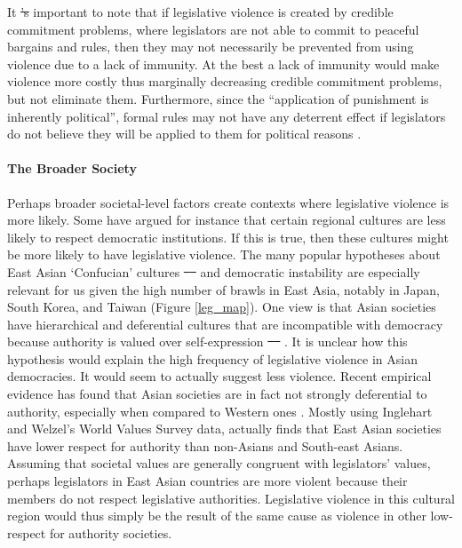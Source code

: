 \documentclass[a4paper]{article}\usepackage[]{graphicx}\usepackage[]{color}
\providecommand{\DIFaddtex}[1]{{\protect\color{blue}\uwave{#1}}} %
\providecommand{\DIFdeltex}[1]{{\protect\color{red}\sout{#1}}}                      %
\providecommand{\DIFaddbegin}{} %
\providecommand{\DIFaddend}{} %
\providecommand{\DIFdelbegin}{} %
\providecommand{\DIFdelend}{} %
\providecommand{\DIFadd}[1]{\texorpdfstring{\DIFaddtex{#1}}{#1}} %
\providecommand{\DIFdel}[1]{\texorpdfstring{\DIFdeltex{#1}}{}} %
\begin{document}
It \DIFdelbegin \DIFdel{'s }\DIFdelend \DIFaddbegin \DIFadd{is }\DIFaddend important to note that if legislative violence is created by credible commitment problems, where legislators are not able to commit to peaceful bargains and rules, then they may not necessarily be prevented from using violence due to a lack of immunity. At the best a lack of immunity would make violence more costly thus marginally decreasing credible commitment problems, but not eliminate them. Furthermore, since the ``application of punishment is inherently political'', formal rules may not have any deterrent effect if legislators do not believe they will be applied to them for political reasons \cite[58]{Wolfe2004}.

\paragraph{The Broader Society}

Perhaps broader societal-level factors create contexts where legislative violence is more likely. Some have argued for instance that certain regional cultures are less likely to respect democratic institutions. If this is true, then these cultures might be more likely to have legislative violence. The many popular hypotheses about East Asian `Confucian' cultures \DIFdelbegin \DIFdel{\mbox{%
\citep[see][]{Inglehart2005, Inglehart2010}
}%
}\DIFdelend \DIFaddbegin \DIFadd{\mbox{%
\citep[]{Inglehart2005, Inglehart2010}
}%
}\DIFaddend and democratic instability are especially relevant for us given the high number of brawls in East Asia, notably in Japan, South Korea, and Taiwan (Figure \ref{leg_map}). One view is that Asian societies have hierarchical and deferential cultures that are incompatible with democracy because authority is valued over self-expression \DIFdelbegin \DIFdel{\mbox{%
\citep[see][212-213 for a discussion]{Dalton2005}
}%
}\DIFdelend \DIFaddbegin \DIFadd{\mbox{%
\citep[212-213]{Dalton2005}
}%
}\DIFaddend . It is unclear how this hypothesis would explain the high frequency of legislative violence in Asian democracies. It would seem to actually suggest less violence. Recent empirical evidence has found that Asian societies are in fact not strongly deferential to authority, especially when compared to Western ones \citep{Dalton2005, KimAsianValues2010}. Mostly using Inglehart and Welzel's World Values Survey data, \cite{KimAsianValues2010} actually finds that East Asian societies have lower respect for authority than non-Asians and South-east Asians. Assuming that societal values are generally congruent with legislators' values, perhaps legislators in East Asian countries are more violent because their members do not respect legislative authorities. Legislative violence in this cultural region would thus simply be the result of the same cause as violence in other low-respect for authority societies.
\end{document}

